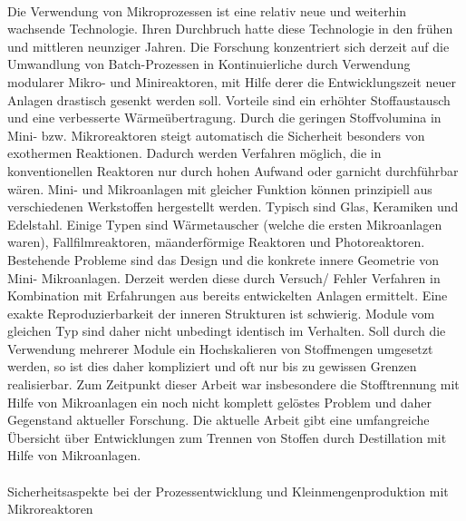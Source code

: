  \paragraph*{\cite{Helling_2012}} Die Verwendung von Mikroprozessen ist eine relativ neue und weiterhin wachsende Technologie. Ihren Durchbruch hatte diese Technologie in den fr\"uhen und mittleren neunziger Jahren. Die Forschung konzentriert sich derzeit auf die Umwandlung von Batch-Prozessen in Kontinuierliche durch Verwendung modularer Mikro- und Minireaktoren, mit Hilfe derer die Entwicklungszeit neuer Anlagen drastisch gesenkt werden soll. Vorteile sind ein erh\"ohter Stoffaustausch und eine verbesserte W\"arme\"ubertragung. Durch die geringen Stoffvolumina in Mini- bzw. Mikroreaktoren steigt automatisch die Sicherheit besonders von exothermen Reaktionen. Dadurch werden Verfahren m\"oglich, die in konventionellen Reaktoren nur durch hohen Aufwand oder garnicht durchf\"uhrbar w\"aren. Mini- und Mikroanlagen mit gleicher Funktion k\"onnen prinzipiell aus verschiedenen Werkstoffen hergestellt werden. Typisch sind Glas, Keramiken und Edelstahl. Einige Typen sind W\"armetauscher (welche die ersten Mikroanlagen waren), Fallfilmreaktoren, m\"aanderf\"ormige Reaktoren und Photoreaktoren. \hfill \newline
Bestehende Probleme sind das Design und die konkrete innere Geometrie von Mini- Mikroanlagen. Derzeit werden diese durch Versuch/ Fehler Verfahren in Kombination mit Erfahrungen aus bereits entwickelten Anlagen ermittelt. Eine exakte Reproduzierbarkeit der inneren Strukturen ist schwierig. Module vom gleichen Typ sind daher nicht unbedingt identisch im Verhalten. Soll durch die Verwendung mehrerer Module ein Hochskalieren von Stoffmengen umgesetzt werden, so ist dies daher kompliziert und oft nur bis zu gewissen Grenzen realisierbar. \hfill \newline
Zum Zeitpunkt dieser Arbeit war insbesondere die Stofftrennung mit Hilfe von Mikroanlagen ein noch nicht komplett gel\"ostes Problem und daher Gegenstand aktueller Forschung. Die aktuelle Arbeit \cite{Yang_2017} gibt eine umfangreiche \"Ubersicht \"uber Entwicklungen zum Trennen von Stoffen durch Destillation mit Hilfe von Mikroanlagen.  

\paragraph*{\cite{Kockmann_2012a}} Sicherheitsaspekte bei der Prozessentwicklung und Kleinmengenproduktion mit Mikroreaktoren

